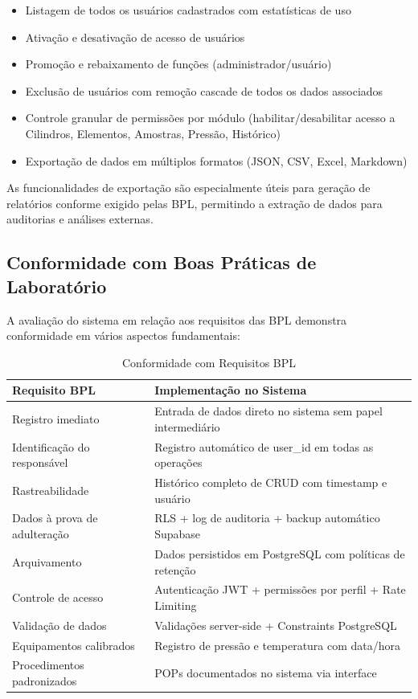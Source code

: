\documentclass[12pt,a4paper]{article}
\begin{document}
\begin{itemize}
\item Listagem de todos os usuários cadastrados com estatísticas de uso
\item Ativação e desativação de acesso de usuários
\item Promoção e rebaixamento de funções (administrador/usuário)
\item Exclusão de usuários com remoção cascade de todos os dados associados
\item Controle granular de permissões por módulo (habilitar/desabilitar acesso a Cilindros, Elementos, Amostras, Pressão, Histórico)
\item Exportação de dados em múltiplos formatos (JSON, CSV, Excel, Markdown)
\end{itemize}

As funcionalidades de exportação são especialmente úteis para geração de relatórios conforme exigido pelas BPL, permitindo a extração de dados para auditorias e análises externas.

\subsection{Conformidade com Boas Práticas de Laboratório}

A avaliação do sistema em relação aos requisitos das BPL demonstra conformidade em vários aspectos fundamentais:

\begin{table}[h!]
\centering
\caption{Conformidade com Requisitos BPL}
\label{tab:bpl-conformidade}
\begin{tabular}{@{}ll@{}}
\toprule
\textbf{Requisito BPL} & \textbf{Implementação no Sistema} \\
\midrule
Registro imediato & Entrada de dados direto no sistema sem papel intermediário \\
Identificação do responsável & Registro automático de user\_id em todas as operações \\
Rastreabilidade & Histórico completo de CRUD com timestamp e usuário \\
Dados à prova de adulteração & RLS + log de auditoria + backup automático Supabase \\
Arquivamento & Dados persistidos em PostgreSQL com políticas de retenção \\
Controle de acesso & Autenticação JWT + permissões por perfil + Rate Limiting \\
Validação de dados & Validações server-side + Constraints PostgreSQL \\
Equipamentos calibrados & Registro de pressão e temperatura com data/hora \\
Procedimentos padronizados & POPs documentados no sistema via interface \\
\bottomrule
\end{tabular}
\end{table}
\end{document}
